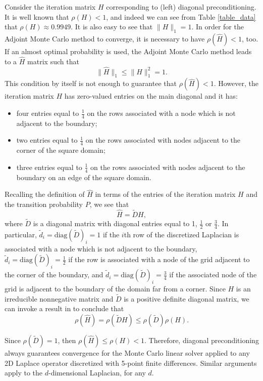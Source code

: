\documentclass[times]{nlaauth}
\begin{document}
Consider the iteration matrix $H$ corresponding to (left) diagonal
preconditioning. It is well known that $\rho(H) <1$, and indeed we
can see from Table \ref{table_data} that $\rho(H)\approx 0.9949$.
It is also easy to see that $\|H\|_1 = 1$.
In order for the Adjoint Monte Carlo
method to converge, it is necessary to
have $\rho(\hat{H}) < 1$, too. If an
almost optimal probability is used,
the Adjoint Monte Carlo method leads to a $\hat{H}$ matrix such that
\[
 \lVert \hat{H}\rVert_1\le \rVert H\rVert_1^2=1.
\]
This condition by itself is not enough to guarantee that
$\rho(\hat{H})<1$.
However, the iteration matrix $H$ has zero-valued
entries on the main diagonal and it has:
\begin{itemize}
 \item four entries equal to $\frac{1}{4}$ on the rows associated
with a node which is not adjacent to the boundary;
\item two entries equal to $\frac{1}{4}$ on the rows associated with nodes
adjacent to the corner of the square domain;
\item three entries equal to $\frac{1}{4}$ on the rows associated with nodes
adjacent to the boundary on an edge of the square domain.
\end{itemize}

Recalling the definition of $\hat{H}$ in terms of the entries of the
iteration matrix $H$ and the transition probability $P$, we see that
\[
 \hat{H}=\tilde{D}H,
\]
where $\tilde{D}$ is a diagonal matrix with diagonal entries equal to
1, $\frac{1}{2}$ or $\frac{3}{4}$.
In particular, $\tilde{d}_i=\text{diag}(\tilde D)_i=1$ if the $i$th row of the
discretized Laplacian is associated with a node which is not adjacent to the
boundary, $\tilde{d}_i=\text{diag}(\tilde D)_i=\frac{1}{2}$ if the row is associated
with a node of the grid adjacent to the corner of the boundary,
and $\tilde{d}_i=\text{diag}(\tilde D)_i=\frac{3}{4}$ if the associated node of the grid
is adjacent to the boundary of the domain far from a corner.
Since $H$ is an irreducible nonnegative matrix and $\tilde{D}$ is a
positive definite diagonal matrix, we can invoke a result in
\cite{FK1975} to conclude that
\[
 \rho(\hat{H})=\rho(\tilde{D}H)\le \rho(\tilde D)\rho(H).
\]

Since $\rho(\tilde{D})=1$, then $\rho(\hat{H})\le \rho(H)<1$.
Therefore, diagonal preconditioning always guarantees convergence
for the Monte Carlo linear solver applied to any 2D Laplace
operator discretized with 5-point finite differences.
Similar arguments apply to the $d$-dimensional Laplacian, for any $d$.
\end{document}
